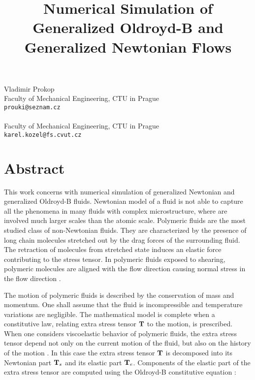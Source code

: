 \title{Numerical Simulation of Generalized Oldroyd-B and Generalized Newtonian Flows}
 \author{} \institute{}
\maketitle
\begin{center}
{\large Vladimir  Prokop}\\
Faculty of Mechanical Engineering, CTU in Prague\\
{\tt prouki@seznam.cz}
\\ \vspace{4mm}{\large Karel Kozel}\\
Faculty of Mechanical Engineering, CTU in Prague\\
{\tt karel.kozel@fs.cvut.cz}

\end{center}

\section*{Abstract}

This work concerns with numerical simulation of generalized Newtonian and generalized Oldroyd-B fluids.
Newtonian model of a fluid is not able to capture all the
phenomena in many fluids with complex microstructure, where are involved much
larger scales than the atomic scale.  Polymeric fluids are the most studied class of
non-Newtonian fluids.
They are characterized by the presence of long chain molecules
stretched out by the drag forces of the surrounding fluid. The retraction of
molecules from stretched state induces an elastic force contributing to the
stress tensor. In polymeric fluids exposed to shearing, polymeric molecules are aligned with
the flow direction causing normal stress in the flow direction \cite{renardy}.

The motion of polymeric fluids is described by the conservation of mass and
momentum. One shall assume that the fluid is incompressible and temperature
variations are negligible. The mathematical model is
complete when a constitutive law, relating extra stress tensor $\bf{T}$ to the motion, is
prescribed. 
When one considers viscoelastic behavior of polymeric fluids, the extra
stress tensor depend not only on the current motion of the fluid, but also on
the history of the motion \cite{bodnar}. In this case the extra stress tensor
${\bf T}$ is decomposed into its Newtonian part ${\bf T}_s$ and its elastic part ${\bf
  T}_e$. Components of the elastic part of the extra stress tensor are computed using
the Oldroyd-B constitutive equation \cite{owens}:

